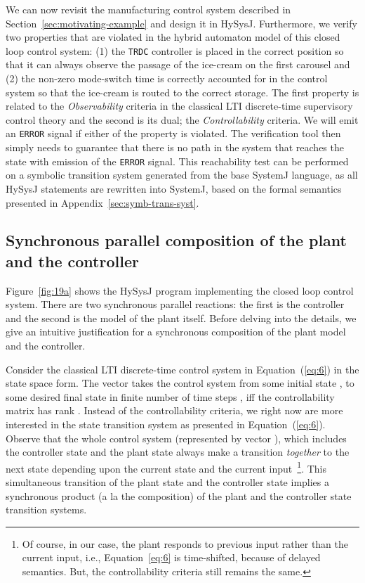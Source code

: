 \documentclass[10pt,journal,cspaper,compsoc]{IEEEtran}
\begin{document}
We can now revisit the manufacturing control system described in
Section~\ref{sec:motivating-example} and design it in
HySysJ. Furthermore, we verify two properties that are violated in the
hybrid automaton model of this closed loop control system: (1) the
\texttt{TRDC} controller is placed in the correct position so that it
can always observe the passage of the ice-cream on the first carousel
and (2) the non-zero mode-switch time is correctly accounted for in the
control system so that the ice-cream is routed to the correct
storage. The first property is related to the \textit{Observability}
criteria in the classical LTI discrete-time supervisory control theory
and the second is its dual; the \textit{Controllability} criteria. We
will emit an \texttt{ERROR} signal if either of the property is
violated. The verification tool then simply needs to guarantee that
there is no path in the system that reaches the state with emission of
the \texttt{ERROR} signal. This reachability test can be performed on a
symbolic transition system generated from the base SystemJ language, as
all HySysJ statements are rewritten into SystemJ, based on the formal
semantics presented in Appendix~\ref{sec:symb-trans-syst}.

\subsection{Synchronous parallel composition of the plant and the controller}
\label{sec:synchr-parall-comp}

Figure~\ref{fig:19a} shows the HySysJ program implementing the closed
loop control system. There are two synchronous parallel reactions: the
first is the controller and the second is the model of the plant
itself. Before delving into the details, we give an intuitive
justification for a synchronous composition of the plant model and the
controller.



Consider the classical LTI discrete-time control system in
Equation~(\ref{eq:6}) in the state space form. The vector 
takes the control system from some initial state
,  to some
desired final state  in finite number of
time steps , \textrm{iff} the controllability matrix has
rank . Instead of the controllability criteria, we right now are more
interested in the state transition system as presented in
Equation~(\ref{eq:6}). Observe that the whole control system
(represented by vector ), which includes the controller
state and the plant state always make a transition \textit{together} to
the next state depending upon the current state and the current
input~\footnote{Of course, in our case, the plant responds to previous
  input rather than the current input, i.e., Equation~\ref{eq:6} is
  time-shifted, because of delayed semantics. But, the controllability
  criteria still remains the same.}. This simultaneous transition of the
plant state and the controller state implies a synchronous product (a la
the  composition) of the plant and the controller state transition
systems.
\end{document}
